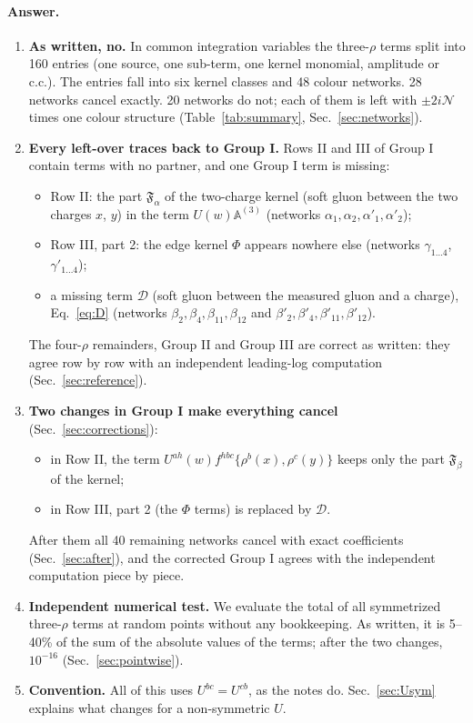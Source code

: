 \documentclass[10pt]{article}
\numberwithin{equation}{section}
\newcommand{\NN}{\mathcal N}
\begin{document}
\paragraph{Answer.}
\begin{enumerate}
\item \textbf{As written, no.} In common integration variables the three-$\rho$ terms split into 160 entries (one source, one sub-term, one kernel monomial, amplitude or c.c.). The entries fall into six kernel classes and 48 colour networks. 28 networks cancel exactly. 20 networks do not; each of them is left with $\pm2i\NN$ times one colour structure (Table~\ref{tab:summary}, Sec.~\ref{sec:networks}).
\item \textbf{Every left-over traces back to Group I.} Rows II and III of Group I contain terms with no partner, and one Group I term is missing:
\begin{itemize}
\item Row II: the part $\mathfrak F_\alpha$ of the two-charge kernel (soft gluon between the two charges $x$, $y$) in the term $U(w)\mathbb A^{(3)}$ (networks $\alpha_1,\alpha_2,\alpha'_1,\alpha'_2$);
\item Row III, part 2: the edge kernel $\Phi$ appears nowhere else (networks $\gamma_{1\ldots4}$, $\gamma'_{1\ldots4}$);
\item a missing term $\mathcal D$ (soft gluon between the measured gluon and a charge), Eq.~\eqref{eq:D} (networks $\beta_2,\beta_4,\beta_{11},\beta_{12}$ and $\beta'_2,\beta'_4,\beta'_{11},\beta'_{12}$).
\end{itemize}
The four-$\rho$ remainders, Group II and Group III are correct as written: they agree row by row with an independent leading-log computation (Sec.~\ref{sec:reference}).
\item \textbf{Two changes in Group I make everything cancel} (Sec.~\ref{sec:corrections}):
\begin{itemize}
\item[(1)] in Row II, the term $U^{ah}(w)f^{hbc}\{\rho^b(x),\rho^c(y)\}$ keeps only the part $\mathfrak F_\beta$ of the kernel;
\item[(2)] in Row III, part 2 (the $\Phi$ terms) is replaced by $\mathcal D$.
\end{itemize}
After them all 40 remaining networks cancel with exact coefficients (Sec.~\ref{sec:after}), and the corrected Group I agrees with the independent computation piece by piece.
\item \textbf{Independent numerical test.} We evaluate the total of all symmetrized three-$\rho$ terms at random points without any bookkeeping. As written, it is 5--40\% of the sum of the absolute values of the terms; after the two changes, $10^{-16}$ (Sec.~\ref{sec:pointwise}).
\item \textbf{Convention.} All of this uses $U^{bc}=U^{cb}$, as the notes do. Sec.~\ref{sec:Usym} explains what changes for a non-symmetric $U$.
\end{enumerate}
\end{document}
